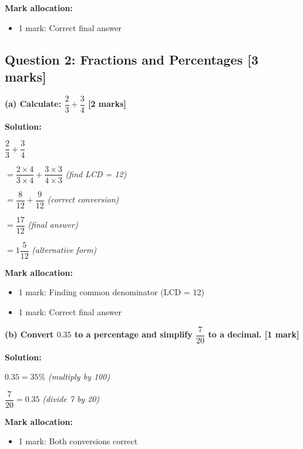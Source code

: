 \documentclass[12pt,a4paper]{article}
\begin{document}
\vspace{0.3cm}
\noindent\textbf{Mark allocation:}
\begin{itemize}
    \item 1 mark: Correct final answer
\end{itemize}

\subsection*{Question 2: Fractions and Percentages [3 marks]}

\textbf{(a) Calculate: $\dfrac{2}{3} + \dfrac{3}{4}$ \hfill [2 marks]}

\vspace{0.2cm}
\noindent\textbf{Solution:}

$\dfrac{2}{3} + \dfrac{3}{4}$

$= \dfrac{2 \times 4}{3 \times 4} + \dfrac{3 \times 3}{4 \times 3}$ \checkmark \quad \textit{(find LCD = 12)}

$= \dfrac{8}{12} + \dfrac{9}{12}$ \checkmark \quad \textit{(correct conversion)}

$= \dfrac{17}{12}$ \checkmark\checkmark \quad \textit{(final answer)}

$= 1\dfrac{5}{12}$ \quad \textit{(alternative form)}

\vspace{0.3cm}
\noindent\textbf{Mark allocation:}
\begin{itemize}
    \item 1 mark: Finding common denominator (LCD = 12)
    \item 1 mark: Correct final answer
\end{itemize}

\vspace{0.4cm}

\textbf{(b) Convert $0.35$ to a percentage and simplify $\dfrac{7}{20}$ to a decimal. \hfill [1 mark]}

\vspace{0.2cm}
\noindent\textbf{Solution:}

$0.35 = 35\%$ \checkmark \quad \textit{(multiply by 100)}

$\dfrac{7}{20} = 0.35$ \checkmark \quad \textit{(divide 7 by 20)}

\vspace{0.3cm}
\noindent\textbf{Mark allocation:}
\begin{itemize}
    \item 1 mark: Both conversions correct
\end{itemize}
\end{document}
